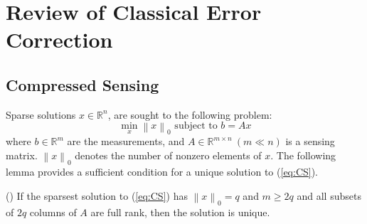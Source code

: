 \documentclass[../../thesis.tex]{subfiles}
\newcommand{\norm}[1]{\left\lVert#1\right\rVert}
\begin{document}





\section{Review of Classical Error Correction}\label{sec:overview}
\subsection{Compressed Sensing}
Sparse solutions $x\in \mathbb{R}^n$, are sought to the following problem:
\begin{equation}
	\min_x \norm{x}_0 \text{ subject to } b= Ax
	\label{eq:CS}
\end{equation}
where $b \in \mathbb{R}^m$ are the measurements, and $A \in \mathbb{R}^{m\times n}~ (m \ll n)$ is a sensing matrix. $\norm{x}_0$ denotes the number of nonzero elements of $x$. The following lemma provides a sufficient condition for a unique solution to (\ref{eq:CS}).

\begin{lem} (\hspace{1sp}\cite{David_Chang}) \label{lem:CS}
If the sparsest solution to (\ref{eq:CS}) has $\norm{x}_0 = q$ and $m\ge 2q$ and all subsets of $2q$ columns of $A$ are full rank, then the solution is unique.
\end{lem}
\end{document}
